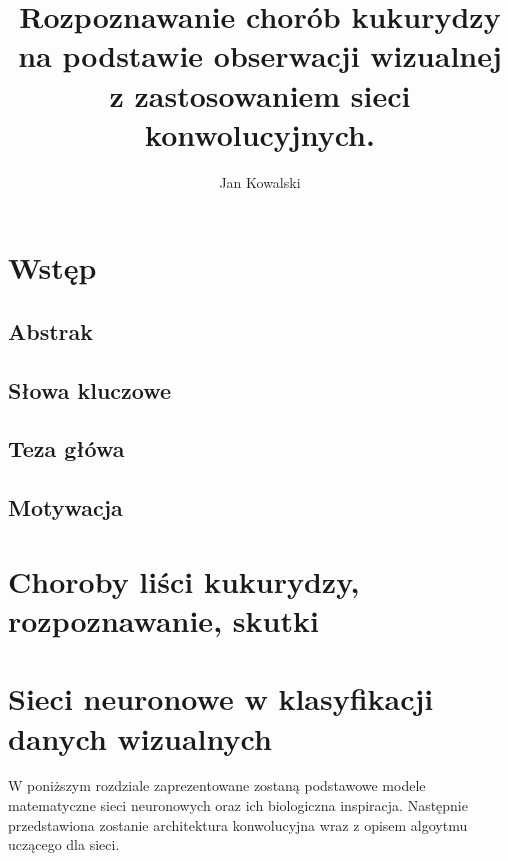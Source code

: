\documentclass{article}
\title{Rozpoznawanie chorób kukurydzy na podstawie obserwacji wizualnej z zastosowaniem 
sieci konwolucyjnych.}
\author{Jan Kowalski}
\begin{document}
\maketitle
\tableofcontents

\section{Wstęp}

\subsection{Abstrak}

\subsection{Słowa kluczowe}

\subsection{Teza główa}

\subsection{Motywacja}



\section{Choroby liści kukurydzy, rozpoznawanie, skutki}

\section{Sieci neuronowe w klasyfikacji danych wizualnych}
W poniższym rozdziale zaprezentowane zostaną podstawowe modele matematyczne sieci neuronowych
oraz ich biologiczna inspiracja. Następnie przedstawiona zostanie architektura konwolucyjna wraz
z opisem algoytmu uczącego dla sieci.
\end{document}
